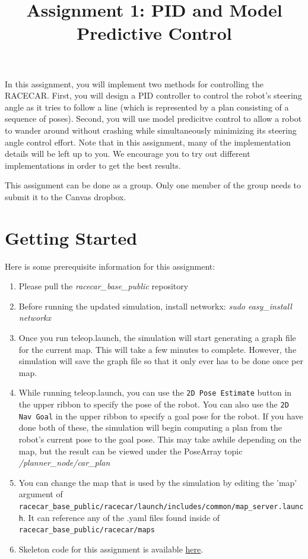 \documentclass[final]{article}
\title{Assignment 1: PID and Model Predictive Control}
\begin{document}
\maketitle
In this assignment, you will implement two methods for controlling the RACECAR. First, you will design a PID controller to control the robot's steering angle as it tries to follow a line (which is represented by a plan consisting of a sequence of poses). Second, you will use model predicitve control to allow a robot to wander around without crashing while simultaneously minimizing its steering angle control effort. Note that in this assignment, many of the implementation details will be left up to you. We encourage you to try out different implementations in order to get the best results.

This assignment can be done as a group. Only one member of the group needs to submit it to the Canvas dropbox.

\section{Getting Started}
Here is some prerequisite information for this assignment:

\begin{enumerate}
\item Please pull the \textit{racecar\_base\_public} repository
\item Before running the updated simulation, install networkx: \textit{sudo easy\_install networkx}
\item Once you run teleop.launch, the simulation will start generating a graph file for the current map. This will take a few minutes to complete. However, the simulation will save the graph file so that it only ever has to be done once per map.
\item While running teleop.launch, you can use the \texttt{2D Pose Estimate} button in the upper ribbon to specify the pose of the robot. You can also use the \texttt{2D Nav Goal} in the upper ribbon to specify a goal pose for the robot. If you have done both of these, the simulation will begin computing a plan from the robot's current pose to the goal pose. This may take awhile depending on the map, but the result can be viewed under the PoseArray topic \textit{/planner\_node/car\_plan}
\item You can change the map that is used by the simulation by editing the 'map' argument of \texttt{racecar\_base\_public/racecar/launch/includes/common/map\_server.launch}. It can reference any of the .yaml files found inside of \texttt{racecar\_base\_public/racecar/maps}
\item Skeleton code for this assignment is available \href{https://gitlab.cs.washington.edu/uw_racecar/course_materials/lab1}{here}.
\end{enumerate}
\end{document}

